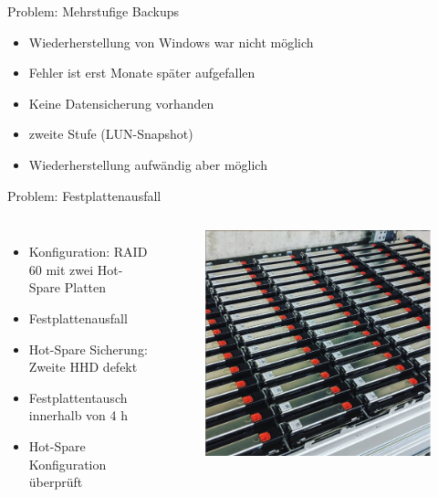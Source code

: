 \documentclass[10pt]{beamer}
\begin{document}
%
%
\begin{frame}[fragile]{Problem: Mehrstufige Backups}
	\begin{itemize}
	\item Wiederherstellung von Windows war nicht möglich
	\item Fehler ist erst Monate später aufgefallen
	\item Keine Datensicherung vorhanden
	\item zweite Stufe (LUN-Snapshot)
	\item Wiederherstellung aufwändig aber möglich
\end{itemize}
\end{frame}

%
%
\begin{frame}[fragile]{Problem: Festplattenausfall}
\begin{columns}[T,c,onlytextwidth]
	\begin{itemize}
		\item Konfiguration: RAID 60 mit zwei Hot-Spare Platten
		\item Festplattenausfall
		\item Hot-Spare Sicherung: Zweite HHD defekt
		\item Festplattentausch innerhalb von 4 h
		\item Hot-Spare Konfiguration überprüft
	\end{itemize}
	\begin{figure}
		\includegraphics[width=1\textwidth]{images/hdd}
	\end{figure}
\end{columns}
\end{frame}
\end{document}
